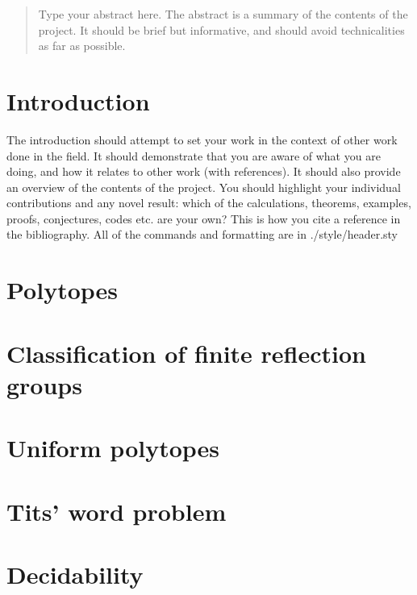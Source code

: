 \documentclass[a4paper,11pt, titlepage]{article}
\begin{document}
\begin{titlepage}

\end{titlepage}

\begin{abstract}
Type your abstract here. The abstract is a summary of the contents of the project. It should be brief but informative, and
should avoid technicalities as far as possible.
\end{abstract}

\tableofcontents
\clearpage

\section{Introduction}
The introduction should attempt to set your work in the context of other work done in the field. It
should demonstrate that you are aware of what you are doing, and how it relates to other work
(with references). It should also provide an overview of the contents of the project. You should
highlight your individual contributions and any novel result: which of the calculations, theorems,
examples, proofs, conjectures, codes etc. are your own? This is how you cite a reference in the bibliography\cite{Humphreys1990}. All of the commands and formatting are in ./style/header.sty

\section{Polytopes}


\section{Classification of finite reflection groups}


\section{Uniform polytopes}


\section{Tits' word problem}


\section{Decidability}



\end{document}
